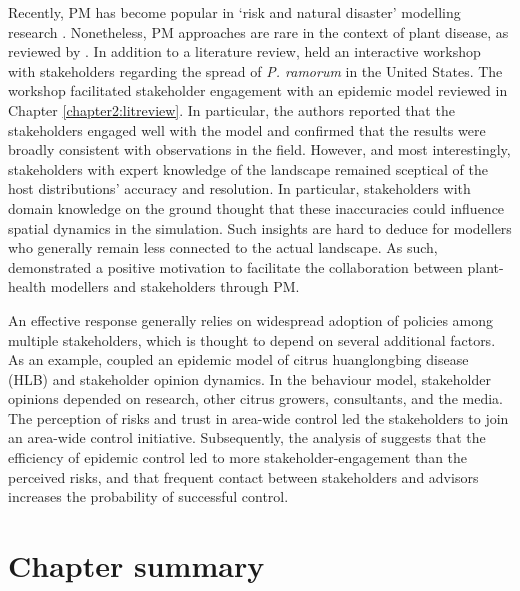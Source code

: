 Recently, PM has become popular in `risk and natural disaster' modelling research \cite{hamalainen2020leadership, ravera2020participatory, hedelin2017participatory}. Nonetheless, PM approaches are rare in the context of plant disease, as reviewed by \cite{gaydos2019forecasting}.
In addition to a literature review, \cite{gaydos2019forecasting} held an interactive workshop with stakeholders regarding the spread of \textit{P. ramorum} in the United States. The workshop facilitated stakeholder engagement with an epidemic model \cite{tonini2017tangible}\textemdash reviewed in Chapter \ref{chapter2:litreview}. In particular, the authors reported that the stakeholders engaged well with the model and confirmed that the results were broadly consistent with observations in the field. However, and most interestingly, stakeholders with expert knowledge of the landscape remained sceptical of the host distributions' accuracy and resolution. In particular, stakeholders with domain knowledge on the ground thought that these inaccuracies could influence spatial dynamics in the simulation. Such insights are hard to deduce for modellers who generally remain less connected to the actual landscape. As such, \cite{tonini2017tangible} demonstrated a positive motivation to facilitate the collaboration 
between plant-health modellers and stakeholders through PM.

An effective response generally relies on widespread adoption of policies among multiple stakeholders, which is thought to depend on several additional factors. As an example, \cite{milne2020makes} coupled an epidemic model of citrus huanglongbing disease (HLB) and stakeholder opinion dynamics. In the behaviour model, stakeholder
opinions depended on research, other citrus growers, consultants, and the media. The perception of risks and trust in area-wide control led the stakeholders to join an area-wide control initiative. Subsequently, the analysis of \cite{milne2020makes} suggests that the efficiency of epidemic control led to more stakeholder-engagement than the perceived risks, and that frequent contact between stakeholders and advisors increases the probability of successful control.

\newpage

\section{Chapter summary}

